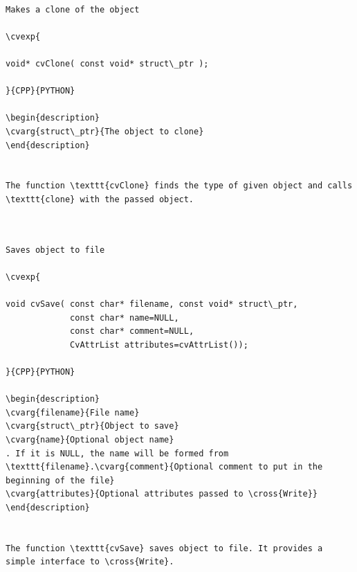 \label{Clone}
\begin{verbatim}

Makes a clone of the object

\cvexp{

void* cvClone( const void* struct\_ptr );

}{CPP}{PYTHON}

\begin{description}
\cvarg{struct\_ptr}{The object to clone}
\end{description}


The function \texttt{cvClone} finds the type of given object and calls \texttt{clone} with the passed object.


\end{verbatim}
\label{Save}
\begin{verbatim}

Saves object to file

\cvexp{

void cvSave( const char* filename, const void* struct\_ptr,
             const char* name=NULL,
             const char* comment=NULL,
             CvAttrList attributes=cvAttrList());

}{CPP}{PYTHON}

\begin{description}
\cvarg{filename}{File name}
\cvarg{struct\_ptr}{Object to save}
\cvarg{name}{Optional object name}
. If it is NULL, the name will be formed from \texttt{filename}.\cvarg{comment}{Optional comment to put in the beginning of the file}
\cvarg{attributes}{Optional attributes passed to \cross{Write}}
\end{description}


The function \texttt{cvSave} saves object to file. It provides a simple interface to \cross{Write}.


\end{verbatim}
\label{Load}
